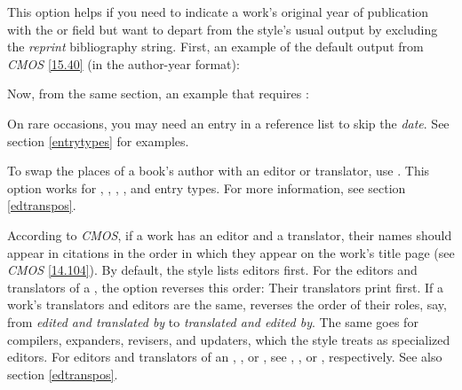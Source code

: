 \documentclass[11pt,letterpaper,oneside]{article}
\begin{document}
\begin{optionlist}

\noindent This option helps if you need to indicate a work's original
year of publication with the  or
 field but want to depart from the style's usual
output by excluding the \textit{reprint} bibliography string. First,
an example of the default output from \textit{CMOS} \ref{15.40} (in
the author-year format):

\begin{refonly}
\nocite{maitland1998}
\end{refonly}

\noindent Now, from the same section, an example that requires
:

\begin{refonly}
\nocite{darwin1964}
\end{refonly}


\noindent On rare occasions, you may need an entry in a reference list
to skip the \textit{date}. See section \ref{entrytypes} for examples.


\noindent To swap the places of a book's author with an editor or
translator, use . This option works for ,
, , , and
 entry types. For more information, see section
\ref{edtranspos}.


\noindent According to \textit{CMOS}, if a work has an editor and a
translator, their names should appear in citations in the order in
which they appear on the work's title page (see \textit{CMOS}
\ref{14.104}). By default, the style lists editors first. For the
editors and translators of a , the option
 reverses this order: Their translators print first. If
a work's translators and editors are the same, 
reverses the order of their roles, say, from \textit{edited and
translated by} to \textit{translated and edited by}. The same goes
for compilers, expanders, revisers, and updaters, which the style
treats as specialized editors. For editors and translators of an
, , or , see
, , or
, respectively. See also section
\ref{edtranspos}.


\end{optionlist}
\end{document}
